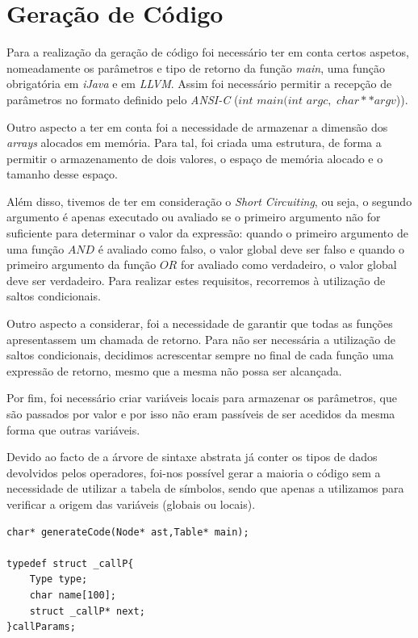 \documentclass[12pt]{article}
\begin{document}
\pagebreak
\section{Geração de Código}

Para a realização da geração de código foi necessário ter em conta certos aspetos, nomeadamente os parâmetros e tipo de retorno da função \emph{main}, uma função obrigatória em \emph{iJava} e em \emph{LLVM}. Assim foi necessário permitir a recepção de parâmetros no formato definido pelo \emph{ANSI-C} ($int$ $main(int$ $argc,$ $char** argv$)).
\par Outro aspecto a ter em conta foi a necessidade de armazenar a dimensão dos \emph{arrays} alocados em memória. Para tal, foi criada uma estrutura, de forma a permitir o armazenamento de dois valores, o espaço de memória alocado e o tamanho desse espaço.
\par Além disso, tivemos de ter em consideração o \emph{Short Circuiting}, ou seja, o segundo argumento é apenas executado ou avaliado se o primeiro argumento não for suficiente para determinar o valor da expressão: quando o primeiro argumento de uma função $AND$ é avaliado como falso, o valor global deve ser falso e quando o primeiro argumento da função $OR$ for avaliado como verdadeiro, o valor global deve ser verdadeiro. Para realizar estes requisitos, recorremos à utilização de saltos condicionais.
\par Outro aspecto a considerar, foi a necessidade de garantir que todas as funções apresentassem um chamada de retorno. Para não ser necessária a utilização de saltos condicionais, decidimos acrescentar sempre no final de cada função uma expressão de retorno, mesmo que a mesma não possa ser alcançada.
\par Por fim, foi necessário  criar variáveis locais para armazenar os parâmetros, que são passados por valor e por isso não eram passíveis de ser acedidos da mesma forma que outras variáveis.
\par Devido ao facto de a árvore de sintaxe abstrata já conter os tipos de dados devolvidos pelos operadores, foi-nos possível gerar a maioria o código sem a necessidade de utilizar a tabela de símbolos, sendo que apenas a utilizamos para verificar a origem das variáveis (globais ou locais).





\begin{lstlisting}
char* generateCode(Node* ast,Table* main);

typedef struct _callP{
    Type type;
    char name[100];
    struct _callP* next;
}callParams;
\end{lstlisting}
\end{document}
